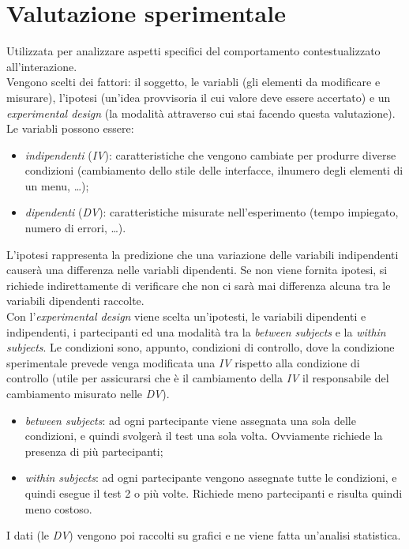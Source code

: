 \section{Valutazione sperimentale}
Utilizzata per analizzare aspetti specifici del comportamento contestualizzato all'interazione. \\
Vengono scelti dei fattori: il soggetto, le variabli (gli elementi da modificare e misurare), l'ipotesi (un'idea provvisoria il cui valore deve essere accertato) e un \textit{experimental design} (la modalit\`a attraverso cui stai facendo questa valutazione).
Le variabli possono essere:
\begin{itemize}
	\item \textit{indipendenti} (\textit{IV}): caratteristiche che vengono cambiate per produrre diverse condizioni (cambiamento dello stile delle interfacce, ilnumero degli elementi di un menu, \ldots);
	\item \textit{dipendenti} (\textit{DV}): caratteristiche misurate nell'esperimento (tempo impiegato, numero di errori, \ldots).
\end{itemize}
L'ipotesi rappresenta la predizione che una variazione delle variabili indipendenti causer\`a una differenza nelle variabli dipendenti. Se non viene fornita ipotesi, si richiede indirettamente di verificare che non ci sar\`a mai differenza alcuna tra le variabili dipendenti raccolte. \\
Con l'\textit{experimental design} viene scelta un'ipotesti, le variabili dipendenti e indipendenti, i partecipanti ed una modalit\`a tra la \textit{between subjects} e la \textit{within subjects}.
Le condizioni sono, appunto, condizioni di controllo, dove la condizione sperimentale prevede venga modificata una \textit{IV} rispetto alla condizione di controllo (utile per assicurarsi che \`e il cambiamento della \textit{IV} il responsabile del cambiamento misurato nelle \textit{DV}).
\begin{itemize}
	\item \textit{between subjects}: ad ogni partecipante viene assegnata una sola delle condizioni, e quindi svolger\`a il test una sola volta. Ovviamente richiede la presenza di pi\`u partecipanti;
	\item \textit{within subjects}: ad ogni partecipante vengono assegnate tutte le condizioni, e quindi esegue il test 2 o pi\`u volte. Richiede meno partecipanti e risulta quindi meno costoso.
\end{itemize}
I dati (le \textit{DV}) vengono poi raccolti su grafici e ne viene fatta un'analisi statistica.

